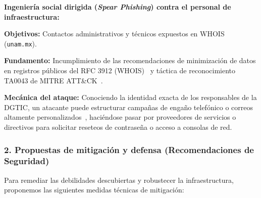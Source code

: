 \begin{enumerateColor}
    \item \textbf{Ingeniería social dirigida (\textit{Spear Phishing}) contra el personal de infraestructura:}
    \begin{itemizeColor}
        \item \textbf{Objetivos:} Contactos administrativos y técnicos expuestos en WHOIS (\texttt{unam.mx}).
        \item \textbf{Fundamento:} Incumplimiento de las recomendaciones de minimización de datos en registros públicos del RFC 3912 (WHOIS)~\cite{rfc3912_whois} y táctica de reconocimiento TA0043 de MITRE ATT\&CK~\cite{mitre_attack_recon}.
        \item \textbf{Mecánica del ataque:} Conociendo la identidad exacta de los responsables de la DGTIC, un atacante puede estructurar campañas de engaño telefónico o correos altamente personalizados~\cite{mitnick_art_of_deception}, haciéndose pasar por proveedores de servicios o directivos para solicitar reseteos de contraseña o acceso a consolas de red.
    \end{itemizeColor}
\end{enumerateColor}

\subsubsection*{2. Propuestas de mitigación y defensa (Recomendaciones de Seguridad)}

Para remediar las debilidades descubiertas y robustecer la infraestructura, proponemos las siguientes medidas técnicas de mitigación:

